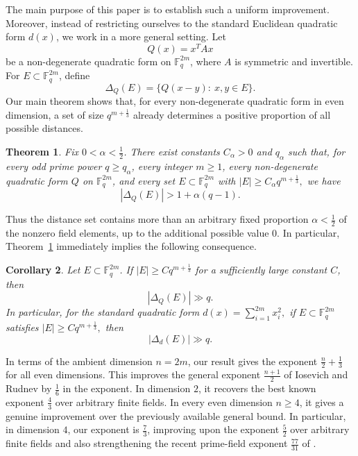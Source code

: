 \documentclass[11pt]{article}
\newtheorem{theorem}{Theorem}[section]
\newtheorem{corollary}[theorem]{Corollary}
\newcommand{\1}{\mathbf{1}}
\begin{document}
The main purpose of this paper is to establish such a uniform improvement. Moreover, instead of restricting ourselves to the standard Euclidean quadratic form \(d(x)\), we work in a more general setting. Let
\[
Q(x)=x^T A x
\]
be a non-degenerate quadratic form on \(\mathbb{F}_q^{2m}\), where \(A\) is symmetric and invertible. For \(E\subset \mathbb{F}_q^{2m}\), define
\[
\Delta_Q(E)
=
\{Q(x-y):\ x,y\in E\}.
\]
Our main theorem shows that, for every non-degenerate quadratic form in even dimension, a set of size \(q^{m+\frac{1}{3}}\) already determines a positive proportion of all possible distances.

\begin{theorem}\label{mainthm}
	Fix \(0<\alpha<\frac12\). There exist constants \(C_\alpha>0\) and \(q_\alpha\) such that, for every odd prime power \(q\ge q_\alpha\), every integer \(m\ge 1\), every non-degenerate quadratic form \(Q\) on \(\mathbb{F}_q^{2m}\), and every set \(E\subset\mathbb{F}_q^{2m}\) with $|E|\ge C_\alpha q^{m+\frac13},$
	we have
	\[
	|\Delta_Q(E)|>1+\alpha(q-1).
	\]
\end{theorem}

Thus the distance set contains more than an arbitrary fixed proportion \(\alpha<\frac{1}{2}\) of the nonzero field elements, up to the additional possible value \(0\). In particular, Theorem~\ref{mainthm} immediately implies the following consequence.

\begin{corollary}
	Let \(E\subset\mathbb{F}_q^{2m}\). If $|E|\ge C q^{m+\frac13}$
	for a sufficiently large constant \(C\), then
	\[
	|\Delta_Q(E)|\gg q.
	\]
	In particular, for the standard quadratic form $d(x)=\sum_{i=1}^{2m}x_i^2,$
	if \(E\subset\mathbb{F}_q^{2m}\) satisfies $|E|\ge C q^{m+\frac13},$
	then
	\[
	|\Delta_d(E)|\gg q.
	\]
\end{corollary}

In terms of the ambient dimension \(n=2m\), our result gives the exponent $\frac n2+\frac13$
for all even dimensions. This improves the general exponent \(\frac{n+1}{2}\) of Iosevich and Rudnev \cite{IR2007} by \(\frac{1}{6}\) in the exponent. In dimension \(2\), it recovers the best known exponent \(\frac{4}{3}\) over arbitrary finite fields. In every even dimension \(n\ge 4\), it gives a genuine improvement over the previously available general bound. In particular, in dimension \(4\), our exponent is \(\frac{7}{3}\), improving upon the exponent \(\frac{5}{2}\) over arbitrary finite fields and also strengthening the recent prime-field exponent \(\frac{77}{31}\) of \cite{PX26}.
\end{document}
